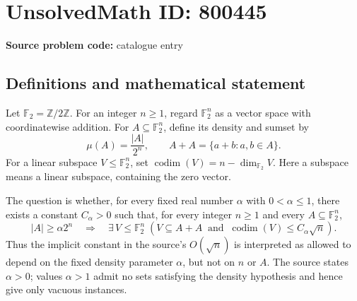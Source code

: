 \documentclass[11pt]{article}
\newcommand{\Z}{\mathbb{Z}}
\newcommand{\F}{\mathbb{F}}
\begin{document}
\section*{UnsolvedMath ID: 800445}
\textbf{Source problem code:} catalogue entry
\subsection{Definitions and mathematical statement}
Let \(\F_2=\Z/2\Z\). For an integer \(n\geq 1\), regard \(\F_2^n\) as a vector space with coordinatewise addition. For \(A\subseteq\F_2^n\), define its density and sumset by
\[
\mu(A)=\frac{|A|}{2^n},\qquad A+A=\{a+b:a,b\in A\}.
\]
For a linear subspace \(V\leq\F_2^n\), set \(\operatorname{codim}(V)=n-\dim_{\F_2}V\). Here a subspace means a linear subspace, containing the zero vector.

The question is whether, for every fixed real number \(\alpha\) with \(0<\alpha\leq 1\), there exists a constant \(C_\alpha>0\) such that, for every integer \(n\geq 1\) and every \(A\subseteq\F_2^n\),
\[
|A|\geq\alpha 2^n
\quad\Longrightarrow\quad
\exists\,V\leq\F_2^n\;\left(V\subseteq A+A\ \text{ and }\ \operatorname{codim}(V)\leq C_\alpha\sqrt n\right).
\]
Thus the implicit constant in the source's \(O(\sqrt n)\) is interpreted as allowed to depend on the fixed density parameter \(\alpha\), but not on \(n\) or \(A\). The source states \(\alpha>0\); values \(\alpha>1\) admit no sets satisfying the density hypothesis and hence give only vacuous instances.
\end{document}
